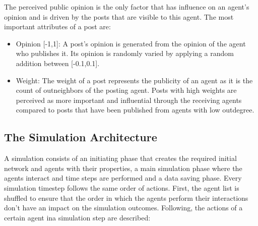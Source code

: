 \documentclass[runningheads]{llncs}
\providecommand{\tightlist}{%
  \setlength{\itemsep}{0pt}\setlength{\parskip}{0pt}}
\begin{document}
The perceived public opinion is the only factor that has influence on an
agent's opinion and is driven by the posts that are visible to this
agent. The most important attributes of a post are:

\begin{itemize}
\tightlist
\item
  Opinion {[}-1,1{]}: A post's opinion is generated from the opinion of
  the agent who publishes it. Its opinion is randomly varied by applying
  a random addition between {[}-0.1,0.1{]}.
\item
  Weight: The weight of a post represents the publicity of an agent as
  it is the count of outneighbors of the posting agent. Posts with high
  weights are perceived as more important and influential through the
  receiving agents compared to posts that have been published from
  agents with low outdegree.
\end{itemize}

\hypertarget{the-simulation-architecture}{%
\subsection{The Simulation
Architecture}\label{the-simulation-architecture}}

A simulation consists of an initiating phase that creates the required
initial network and agents with their properties, a main simulation
phase where the agents interact and time steps are performed and a data
saving phase. Every simulation timestep follows the same order of
actions. First, the agent list is shuffled to ensure that the order in
which the agents perform their interactions don't have an impact on the
simulation outcomes. Following, the actions of a certain agent ina
simulation step are described:
\end{document}
